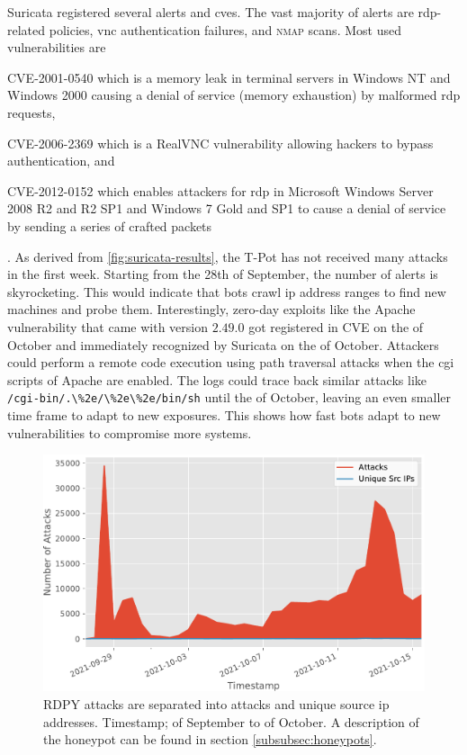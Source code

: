 Suricata registered several alerts and \acsp{cve}.
The vast majority of alerts are \ac{rdp}-related policies, \ac{vnc} authentication failures, and \textsc{nmap} scans.
Most used vulnerabilities are
\begin{enumerate*}[label=(\roman*)]
    \item CVE-2001-0540\cite{CVE-2001-0540} which is a memory leak in terminal servers in Windows NT and Windows 2000 causing a denial of service (memory exhaustion) by malformed \ac{rdp} requests,
    \item CVE-2006-2369\cite{CVE-2006-2369} which is a RealVNC vulnerability allowing hackers to bypass authentication, and
    \item CVE-2012-0152\cite{CVE-2012-0152} which enables attackers for \ac{rdp} in Microsoft Windows Server 2008 R2 and R2 SP1 and Windows 7 Gold and SP1 to cause a denial of service by sending a series of crafted packets
\end{enumerate*}.
As derived from \autoref{fig:suricata-results}, the T-Pot has not received many attacks in the first week.
Starting from the 28th of September, the number of alerts is skyrocketing.
This would indicate that bots crawl \ac{ip} address ranges to find new machines and probe them.
Interestingly, zero-day exploits like the Apache vulnerability \cite{CVE-2021-42013} that came with version $2.49.0$ got registered in CVE on the  of October and immediately recognized by Suricata on the  of October.
Attackers could perform a remote code execution using path traversal attacks when the \ac{cgi} scripts of Apache are enabled.
The logs could trace back similar attacks like \verb|/cgi-bin/.\%2e/\%2e\%2e/bin/sh| until the  of October, leaving an even smaller time frame to adapt to new exposures.
This shows how fast bots adapt to new vulnerabilities to compromise more systems.

\begin{figure}[htbp]
    \centering
    \includegraphics[width=\textwidth]{figures/tpot-rdpy-port.pdf}
    \caption[RDPY results of T-Pot]{
        RDPY attacks are separated into attacks and unique source \ac{ip} addresses.
        Timestamp;  of September to  of October.
        A description of the honeypot can be found in section \ref{subsubsec:honeypots}.
    }
    \label{fig:rdpy-results}
\end{figure}

